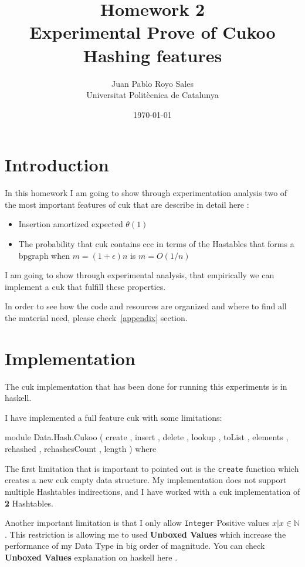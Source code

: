 \documentclass[12pt, a4paper]{article}
\title{%
      Homework 2 \\
      Experimental Prove of Cukoo Hashing features
}
\author{%
  Juan Pablo Royo Sales \\
  \small{Universitat Politècnica de Catalunya}
}
\date\today
\begin{document}
\maketitle

\section{Introduction}
In this homework I am going to show through experimentation analysis two of the most important features of \acrfull{cuk} that are describe in detail here \cite{cukoo}:

\begin{itemize}
  \item Insertion amortized expected $\theta(1)$
  \item The probability that \acrshort{cuk} contains \acrfull{ccc} in terms of the Hastables that forms a \acrfull{bpgraph} when $m = (1+\epsilon)n$ is $m =O(1/n)$ \cite{kutze}
\end{itemize}

I am going to show through experimental analysis, that empirically we can implement a \acrshort{cuk} that fulfill these properties.

In order to see how the code and resources are organized and where to find all the material need, please check~\ref{appendix} section.

\section{Implementation}
The \acrshort{cuk} implementation that has been done for running this experiments is in \acrfull{haskell}.

I have implemented a full feature \acrshort{cuk} with some limitations:

\begin{haskellcode*}{}
module Data.Hash.Cukoo
  ( create
  , insert
  , delete
  , lookup
  , toList
  , elements
  , rehashed
  , rehashesCount
  , length
  ) where
\end{haskellcode*}

The first limitation that is important to pointed out is the \texttt{create} function which creates a new \acrshort{cuk} empty data structure. My implementation does not support multiple Hashtables indirections, and I have worked with a \acrshort{cuk} implementation of \textbf{2} Hashtables.

Another important limitation is that I only allow \texttt{Integer} Positive values $x | x \in \mathbb{N}$. This restriction is allowing me to used \textbf{Unboxed Values} which increase the performance of my Data Type in big order of magnitude. You can check \textbf{Unboxed Values} explanation on \acrshort{haskell} here \cite{unboxed}.
\end{document}
